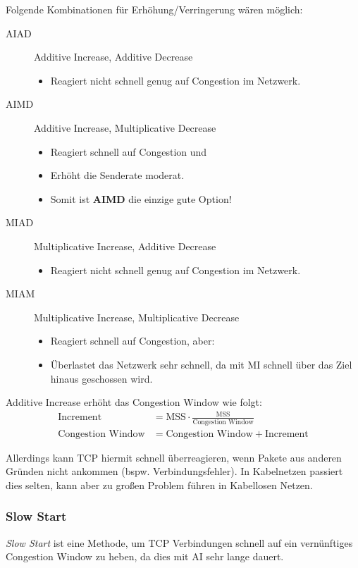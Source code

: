 				Folgende Kombinationen für Erhöhung/Verringerung wären möglich:
				\begin{description}
					\item[AIAD] Additive Increase, Additive Decrease
						\begin{itemize}
							\item Reagiert nicht schnell genug auf Congestion im Netzwerk.
						\end{itemize}
					\item[AIMD] Additive Increase, Multiplicative Decrease
						\begin{itemize}
							\item Reagiert schnell auf Congestion und
							\item Erhöht die Senderate moderat.
							\item Somit ist \textbf{AIMD} die einzige gute Option!
						\end{itemize}
					\item[MIAD] Multiplicative Increase, Additive Decrease
						\begin{itemize}
							\item Reagiert nicht schnell genug auf Congestion im Netzwerk.
						\end{itemize}
					\item[MIAM] Multiplicative Increase, Multiplicative Decrease
						\begin{itemize}
							\item Reagiert schnell auf Congestion, aber:
							\item Überlastet das Netzwerk sehr schnell, da mit MI schnell über das Ziel hinaus geschossen wird.
						\end{itemize}
				\end{description}

				Additive Increase erhöht das Congestion Window wie folgt:
				\begin{align*}
					\text{Increment}         & = \text{MSS} \cdot \frac{\text{MSS}}{\text{Congestion Window}} \\
					\text{Congestion Window} & = \text{Congestion Window} + \text{Increment}
				\end{align*}

				Allerdings kann TCP hiermit schnell überreagieren, wenn Pakete aus anderen Gründen nicht ankommen (bspw. Verbindungsfehler). In Kabelnetzen passiert dies selten, kann aber zu großen Problem führen in Kabellosen Netzen.

			\subsubsection{Slow Start}
				\textit{Slow Start} ist eine Methode, um TCP Verbindungen schnell auf ein vernünftiges Congestion Window zu heben, da dies mit AI sehr lange dauert.

